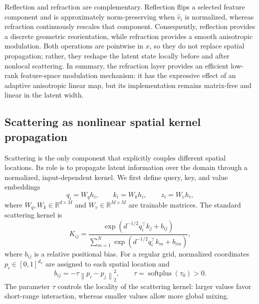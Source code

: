 \documentclass{article}
\newcommand{\R}{\mathbb{R}}
\newcommand{\norm}[1]{\left\lVert #1\right\rVert}
\begin{document}
Reflection and refraction are complementary. Reflection flips a selected feature component and is approximately norm-preserving when $\widehat v_i$ is normalized, whereas refraction continuously rescales that component. Consequently, reflection provides a discrete geometric reorientation, while refraction provides a smooth anisotropic modulation. Both operations are pointwise in $x$, so they do not replace spatial propagation; rather, they reshape the latent state locally before and after nonlocal scattering. In summary, the refraction layer provides an efficient low-rank feature-space modulation mechanism: it has the expressive effect of an adaptive anisotropic linear map, but its implementation remains matrix-free and linear in the latent width.

\subsection{Scattering as nonlinear spatial kernel propagation}

Scattering is the only component that explicitly couples different spatial locations. Its role is to propagate latent information over the domain through a normalized, input-dependent kernel. We first define query, key, and value embeddings
\begin{equation}
    q_i=W_q h_i,
    \qquad
    k_i=W_k h_i,
    \qquad
    z_i=W_v h_i,
    \label{eq:qkv}
\end{equation}
where $W_q,W_k\in\R^{d\times M}$ and $W_v\in\R^{M\times M}$ are trainable matrices. The standard scattering kernel is
\begin{equation}
    K_{ij}
    =
    \frac{
    \exp\left(d^{-1/2}q_i^\top k_j + b_{ij}\right)
    }{
    \sum_{m=1}^{N}\exp\left(d^{-1/2}q_i^\top k_m + b_{im}\right)
    },
    \label{eq:standard-kernel}
\end{equation}
where $b_{ij}$ is a relative positional bias. For a regular grid, normalized coordinates $p_i\in[0,1]^{d_x}$ are assigned to each spatial location and
\begin{equation}
    b_{ij}=-\tau\norm{p_i-p_j}_2^2,
    \qquad \tau=\operatorname{softplus}(\tau_0)>0.
    \label{eq:relative-bias}
\end{equation}
The parameter $\tau$ controls the locality of the scattering kernel: larger values favor short-range interaction, whereas smaller values allow more global mixing.
\end{document}
